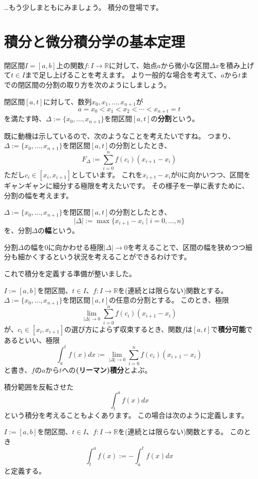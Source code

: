 …もう少しまともにみましょう。
積分の登場です。



\section{積分と微分積分学の基本定理}

閉区間$I=[a,b]$上の関数$f:I\to\mathbb{R}$に対して、始点$a$から微小な区間$\Delta x$を積み上げて$t\in I$まで足し上げることを考えます。
より一般的な場合を考えて、$a$から$t$までの閉区間の分割の取り方を次のようにしましょう。
\begin{definition}
  閉区間$[a,t]$に対して、数列$x_0,x_1,\dots,x_{n+1}$が
  \[
    a=x_0<x_1<x_2<\cdots<x_{n+t}=t
  \]
  を満たす時、$\Delta:=\{x_0,\dots,x_{n+1}\}$を閉区間$[a,t]$の\textbf{分割}という。
\end{definition}
既に動機は示しているので、次のようなことを考えたいですね。
つまり、$\Delta:=\{x_0,\dots,x_{n+1}\}$を閉区間$[a,t]$の分割としたとき、
\[
  F_\Delta:=\sum_{i=0}^n f(c_i)(x_{i+1}-x_i)
\]
ただし$c_i\in[x_i,x_{i+1}]$としています。
これを$x_{i+t}-x_i$が0に向かいつつ、区間をギャンギャンに細分する極限を考えたいです。
その様子を一挙に表すために、分割の幅を考えます。
\begin{definition}
  $\Delta:=\{x_0,\dots,x_{n+1}\}$を閉区間$[a,t]$の分割としたとき、
  \[
    |\Delta|:=\max\{x_{i+1}-x_i\mid i=0,\dots,n\}
  \]
  を、分割$\Delta$の\textbf{幅}という。
\end{definition}
分割$\Delta$の幅を0に向かわせる極限$|\Delta|\to0$を考えることで、区間の幅を狭めつつ細分も細かくするという状況を考えることができるわけです。

これで積分を定義する準備が整いました。
\begin{definition}
  $I:=[a,b]$を閉区間、$t\in I$、$f:I\to\mathbb{R}$を(連続とは限らない)関数とする。
  $\Delta:=\{x_0,\dots,x_{n+1}\}$を閉区間$[a,t]$の任意の分割とする。
  このとき、極限
  \[
    \lim_{|\Delta|\to0}\sum_{i=0}^n f(c_i)(x_{i+1}-x_i)
  \]
  が、$c_i\in[x_i,x_{i+1}]$の選び方によらず収束するとき、関数$f$は$[a,t]$で\textbf{積分可能}であるといい、極限
  \[
    \int_a^tf(x)dx:=\lim_{|\Delta|\to0}\sum_{i=0}^n f(c_i)(x_{i+1}-x_i)
  \]
  と書き、$f$の$a$から$t$への\textbf{(リーマン)積分}とよぶ。
\end{definition}

積分範囲を反転させた
\[
  \int_t^a f(x)dx
\]
という積分を考えることもよくあります。
この場合は次のように定義します。
\begin{definition}
  $I:=[a,b]$を閉区間、$t\in I$、$f:I\to\mathbb{R}$を(連続とは限らない)関数とする。
  このとき
  \[
    \int_t^a f(x):=-\int_a^t f(x)dx
  \]
  と定義する。
\end{definition}

